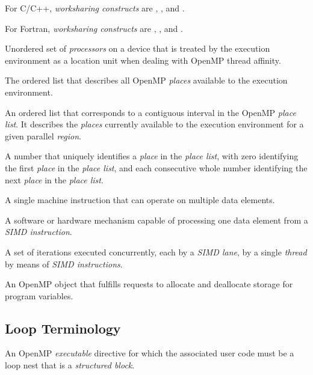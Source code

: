 For C/C++, \emph{worksharing constructs} are , , and .

For Fortran, \emph{worksharing constructs} are , ,  and 
.
\glossarydefend

\newpage
{}
\glossarydefstart
Unordered set of \emph{processors} on a device that is treated by the execution environment as a 
location unit when dealing with OpenMP thread affinity.
\glossarydefend

\glossarydefstart
The ordered list that describes all OpenMP \emph{places} available to the execution 
environment.
\glossarydefend

\glossarydefstart
An ordered list that corresponds to a contiguous interval in the OpenMP \emph{place list}. 
It describes the \emph{places} currently available to the execution environment for a given 
parallel \emph{region}.
\glossarydefend

\glossarydefstart
A number that uniquely identifies a \emph{place} in the \emph{place list}, with zero identifying the first \emph{place} in the \emph{place list}, and each consecutive whole number identifying the next \emph{place} in the \emph{place list}.
\glossarydefend

\glossarydefstart
A single machine instruction that can operate on multiple data elements.
\glossarydefend

\glossarydefstart
A software or hardware mechanism capable of processing one data element from a 
\emph{SIMD instruction}.
\glossarydefend

\glossarydefstart
A set of iterations executed concurrently, each by a \emph{SIMD lane}, by a single \emph{thread}
by means of \emph{SIMD instructions}.
\glossarydefend

\glossarydefstart
An OpenMP object that fulfills requests to allocate and deallocate storage for program variables.
\glossarydefend

%
%
\subsection{Loop Terminology}
\label{subsec:Loop Terminology}
\glossarydefstart
An OpenMP \emph{executable} directive for which the associated user code must be a loop nest that is a \emph{structured block}.
\glossarydefend


